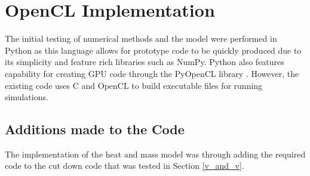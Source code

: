 \documentclass[../Interim_Report_Master]{subfiles}
\begin{document}
\hypertarget{op_imp}{\section{OpenCL Implementation}\label{op_imp}}
The initial testing of numerical methods and the model were performed in Python as this language allows for prototype code to be quickly produced due to its simplicity and feature rich libraries such as NumPy. Python also features capability for creating GPU code through the PyOpenCL library \cite{pyopencl}. However, the existing code uses C and OpenCL to build executable files for running simulations. 

\subsection{Additions made to the Code}
The implementation of the heat and mass model was through adding the required code to the cut down code that was tested in Section \ref{v_and_v}.
\end{document}
